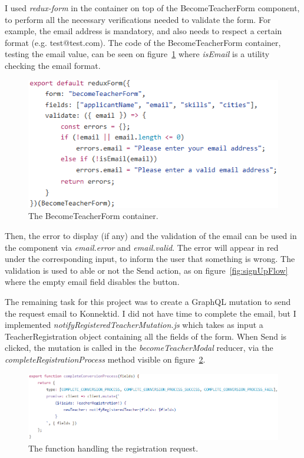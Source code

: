 I used \textit{redux-form} in the container on top of the BecomeTeacherForm component, to perform all the necessary verifications needed to validate the form. For example, the email address is mandatory, and also needs to respect a certain format (e.g. test@test.com). The code of the BecomeTeacherForm container, testing the email value, can be seen on {\sc figure}~\ref{fig:reduxForm} where \textit{isEmail} is a utility checking the email format.

 \begin{figure}[H]
    \centering
    \includegraphics[scale=0.8]{figure/reduxForm.png}
    \caption{The \guillemotleft{} BecomeTeacherForm \guillemotright{} container.}
    \label{fig:reduxForm}
\end{figure}

Then, the error to display (if any) and the validation of the email can be used in the component via \textit{email.error} and \textit{email.valid}. The error will appear in red under the corresponding input, to inform the user that something is wrong. The validation is used to able or not the \guillemotleft{} Send \guillemotright{} action, as on {\sc figure}~\ref{fig:signUpFlow} where the empty email field disables the button.

The remaining task for this project was to create a GraphQL mutation to send the request email to Konnektid. I did not have time to complete the email, but I implemented \textit{notifyRegisteredTeacherMutation.js} which takes as input a \guillemotleft{} TeacherRegistration \guillemotright{} object containing all the fields of the form. When \guillemotleft{} Send \guillemotright{} is clicked, the mutation is called in the \textit{becomeTeacherModal} reducer, via the \textit{completeRegistrationProcess} method visible on {\sc figure}~\ref{fig:completeRegistration}.

 \begin{figure}[H]
    \centering
    \includegraphics[scale=0.8]{figure/completeRegistration.png}
    \caption{The function handling the registration request.}
    \label{fig:completeRegistration}
\end{figure}


